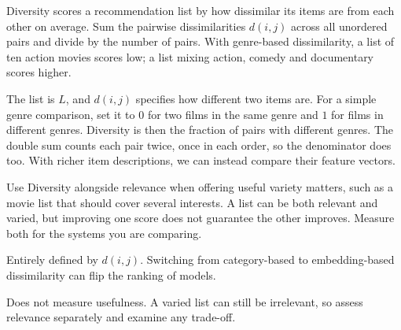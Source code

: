 Diversity scores a recommendation list by how dissimilar its items are from each other on average. Sum the pairwise dissimilarities $d(i, j)$ across all unordered pairs and divide by the number of pairs. With genre-based dissimilarity, a list of ten action movies scores low; a list mixing action, comedy and documentary scores higher.

\begin{metricformula}
\end{metricformula}

The list is $L$, and $d(i,j)$ specifies how different two items are. For a simple genre comparison, set it to $0$ for two films in the same genre and $1$ for films in different genres. Diversity is then the fraction of pairs with different genres. The double sum counts each pair twice, once in each order, so the denominator does too. With richer item descriptions, we can instead compare their feature vectors.


Use Diversity alongside relevance when offering useful variety matters, such as a movie list that should cover several interests. A list can be both relevant and varied, but improving one score does not guarantee the other improves. Measure both for the systems you are comparing.

{
    \item Entirely defined by $d(i, j)$. Switching from category-based to embedding-based dissimilarity can flip the ranking of models.
    \item Does not measure usefulness. A varied list can still be irrelevant, so assess relevance separately and examine any trade-off.
}

